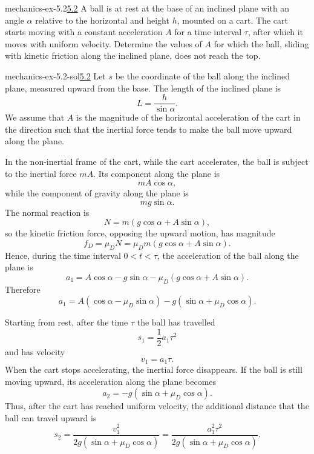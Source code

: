 \documentclass[preview]{standalone}
\begin{document}
\begin{snippetexercise}{mechanics-ex-5.2}{\underline{5.2}}
    A ball is at rest at the base of an inclined plane with an angle \(\alpha\) relative to the horizontal and height \( h \), mounted on a cart. The cart starts moving with a constant acceleration \( A \) for a time interval \( \tau \), after which it moves with uniform velocity. Determine the values of \( A \) for which the ball, sliding with kinetic friction along the inclined plane, does not reach the top.
\end{snippetexercise}

\begin{snippetsolution}{mechanics-ex-5.2-sol}{\underline{5.2}}
    Let \(s\) be the coordinate of the ball along the inclined plane, measured upward
    from the base. The length of the inclined plane is
    \[
        L = \frac{h}{\sin\alpha}.
    \]
    We assume that \(A\) is the magnitude of the horizontal acceleration of the cart
    in the direction such that the inertial force tends to make the ball move upward
    along the plane.

    In the non-inertial frame of the cart, while the cart accelerates, the ball is
    subject to the inertial force \(mA\). Its component along the plane is
    \[
        mA\cos\alpha,
    \]
    while the component of gravity along the plane is
    \[
        mg\sin\alpha.
    \]
    The normal reaction is
    \[
        N = m(g\cos\alpha + A\sin\alpha),
    \]
    so the kinetic friction force, opposing the upward motion, has magnitude
    \[
        f_D = \mu_D N
        =
        \mu_D m(g\cos\alpha + A\sin\alpha).
    \]
    Hence, during the time interval \(0<t<\tau\), the acceleration of the ball along
    the plane is
    \[
        a_1
        =
        A\cos\alpha
        -
        g\sin\alpha
        -
        \mu_D(g\cos\alpha + A\sin\alpha).
    \]
    Therefore
    \[
        a_1
        =
        A(\cos\alpha-\mu_D\sin\alpha)
        -
        g(\sin\alpha+\mu_D\cos\alpha).
    \]

    Starting from rest, after the time \(\tau\) the ball has travelled
    \[
        s_1 = \frac{1}{2}a_1\tau^2
    \]
    and has velocity
    \[
        v_1 = a_1\tau.
    \]
    When the cart stops accelerating, the inertial force disappears. If the ball is
    still moving upward, its acceleration along the plane becomes
    \[
        a_2 = -g(\sin\alpha+\mu_D\cos\alpha).
    \]
    Thus, after the cart has reached uniform velocity, the additional distance that
    the ball can travel upward is
    \[
        s_2
        =
        \frac{v_1^2}{2g(\sin\alpha+\mu_D\cos\alpha)}
        =
        \frac{a_1^2\tau^2}
        {2g(\sin\alpha+\mu_D\cos\alpha)}.
    \]


\end{snippetsolution}
\end{document}
